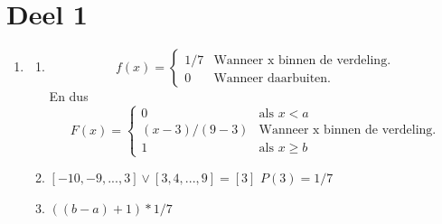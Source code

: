 \documentclass[pdftex,12pt,a4paper]{article}
\begin{document}

\section{Deel 1}
\begin{enumerate}
    \item
        \begin{enumerate}
            \item
            	$$ f(x) =    \left\{
                                \begin{matrix}
                                    1/7 & \text{Wanneer x binnen de verdeling.}\\
                                    0 & \text{Wanneer daarbuiten.}
                                \end{matrix}
                            \right. $$
                En dus\\
                $$ F(x) =    \left\{
                                \begin{matrix}
                                    0 & \text{als $x < a$}\\
                                    (x-3)/(9-3) & \text{Wanneer x binnen de verdeling.}\\
                                    1 & \text{als $x \geq b$}
                                \end{matrix}
                            \right. $$
            \item
                $[-10,-9,...,3] \vee [3,4,...,9] = [3]$
                $P(3) = 1/7$
            \item
                $((b-a) + 1) * 1/7$
        \end{enumerate}


\end{enumerate}
\end{document}
